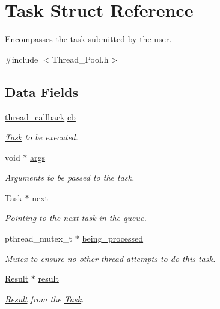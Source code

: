 \hypertarget{struct_task}{}\section{Task Struct Reference}
\label{struct_task}


Encompasses the task submitted by the user.  




{\ttfamily \#include $<$Thread\+\_\+\+Pool.\+h$>$}

\subsection*{Data Fields}
\begin{DoxyCompactItemize}
\item 
\hyperlink{_thread___pool_8h_a6020f0ebe47b326c900080b168c40b53}{thread\+\_\+callback} \hyperlink{struct_task_a70806280c684914c6f1e1b9eb1b248c4}{cb}
\begin{DoxyCompactList}\small\item\em \hyperlink{struct_task}{Task} to be executed. \end{DoxyCompactList}\item 
void $\ast$ \hyperlink{struct_task_add0eb34e0cef9e763462cf9080f9be0a}{args}
\begin{DoxyCompactList}\small\item\em Arguments to be passed to the task. \end{DoxyCompactList}\item 
\hyperlink{struct_task}{Task} $\ast$ \hyperlink{struct_task_afc791d22abed6d81e714bb3993c31223}{next}
\begin{DoxyCompactList}\small\item\em Pointing to the next task in the queue. \end{DoxyCompactList}\item 
pthread\+\_\+mutex\+\_\+t $\ast$ \hyperlink{struct_task_a985c44ad446f8eb8a9ac6958682f28e0}{being\+\_\+processed}
\begin{DoxyCompactList}\small\item\em Mutex to ensure no other thread attempts to do this task. \end{DoxyCompactList}\item 
\hyperlink{struct_result}{Result} $\ast$ \hyperlink{struct_task_a47963d2c7f557db21790fb71b8cd20d6}{result}
\begin{DoxyCompactList}\small\item\em \hyperlink{struct_result}{Result} from the \hyperlink{struct_task}{Task}. \end{DoxyCompactList}\end{DoxyCompactItemize}


